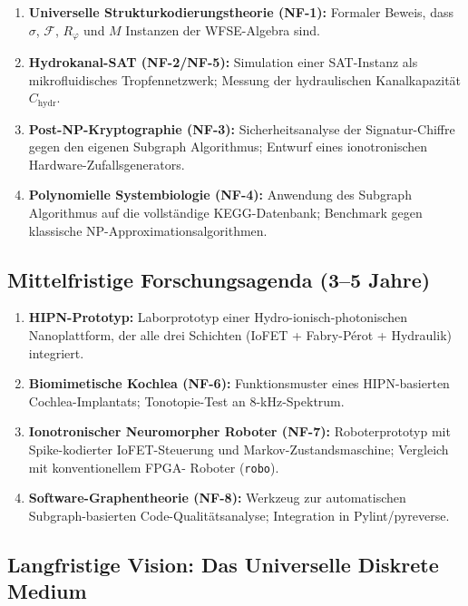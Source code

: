 ﻿\documentclass[a4paper,12pt]{scrreprt}
\theoremstyle{definition}
\begin{document}
\begin{enumerate}
  \item \textbf{Universelle Strukturkodierungstheorie (NF-1):}
    Formaler Beweis, dass $\sigma$, $\mathcal{F}$, $R_\varphi$ und $M$
    Instanzen der WFSE-Algebra sind.

  \item \textbf{Hydrokanal-SAT (NF-2/NF-5):}
    Simulation einer SAT-Instanz als mikrofluidisches Tropfennetzwerk;
    Messung der hydraulischen Kanalkapazität $C_{\mathrm{hydr}}$.

  \item \textbf{Post-NP-Kryptographie (NF-3):}
    Sicherheitsanalyse der Signatur-Chiffre gegen den eigenen
    Subgraph Algorithmus; Entwurf eines ionotronischen
    Hardware-Zufallsgenerators.

  \item \textbf{Polynomielle Systembiologie (NF-4):}
    Anwendung des Subgraph Algorithmus auf die vollständige
    KEGG-Datenbank; Benchmark gegen klassische NP-Approxi\-mationsalgorithmen.
\end{enumerate}

\subsection{Mittelfristige Forschungsagenda (3--5 Jahre)}

\begin{enumerate}
  \item \textbf{HIPN-Prototyp:} Laborprototyp einer
    Hydro-ionisch-photonischen Nanoplattform, der alle drei
    Schichten (IoFET + Fabry-Pérot + Hydraulik) integriert.

  \item \textbf{Biomimetische Kochlea (NF-6):}
    Funktionsmuster eines HIPN-basierten Cochlea-Implantats;
    Tonotopie-Test an 8-kHz-Spektrum.

  \item \textbf{Ionotronischer Neuromorpher Roboter (NF-7):}
    Roboterprototyp mit Spike-kodierter IoFET-Steuerung und
    Markov-Zustandsmaschine; Vergleich mit konventionellem FPGA-
    Roboter (\texttt{robo}).

  \item \textbf{Software-Graphentheorie (NF-8):}
    Werkzeug zur automatischen Subgraph-basierten Code-Qualitätsanalyse;
    Integration in Pylint/pyreverse.
\end{enumerate}

\subsection{Langfristige Vision: Das Universelle Diskrete Medium}
\end{document}
